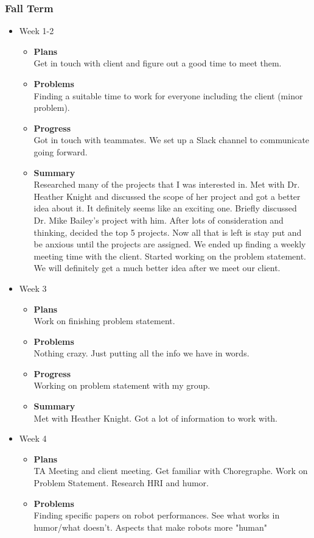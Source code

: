 	\subsubsection{Fall Term}
	\begin{itemize}
		\item{Week 1-2}
			\begin{itemize}
				\item \textbf{Plans} \\
				Get in touch with client and figure out a good time to meet them.
				\item \textbf{Problems} \\
				Finding a suitable time to work for everyone including the client (minor problem).
				\item \textbf{Progress} \\
				Got in touch with teammates. We set up a Slack channel to communicate going forward. 
				\item \textbf{Summary} \\
				Researched many of the projects that I was interested in. Met with Dr. Heather Knight and discussed the scope of her project and got a better idea about it. It definitely seems like an exciting one. Briefly discussed Dr. Mike Bailey's project with him. After lots of consideration and thinking, decided the top 5 projects. Now all that is left is stay put and be anxious until the projects are assigned. 
				We ended up finding a weekly meeting time with the client. Started working on the problem statement.  We will definitely get a much better idea after we meet our client. 
			\end{itemize}
		\item{Week 3}	
			\begin{itemize}
				\item \textbf{Plans} \\
				Work on finishing problem statement.
				\item \textbf{Problems} \\
				Nothing crazy. Just putting all the info we have in words.
				\item \textbf{Progress} \\
				Working on problem statement with my group.
				\item \textbf{Summary} \\
				Met with Heather Knight. Got a lot of information to work with.
			\end{itemize}
		\item{Week 4}
			\begin{itemize}
				\item \textbf{Plans} \\
				TA Meeting and client meeting. Get familiar with Choregraphe. Work on Problem Statement. Research HRI and humor.
				\item \textbf{Problems} \\
				Finding specific papers on robot performances. See what works in humor/what doesn’t. Aspects that make robots more "human"


\end{itemize}
\end{itemize}
